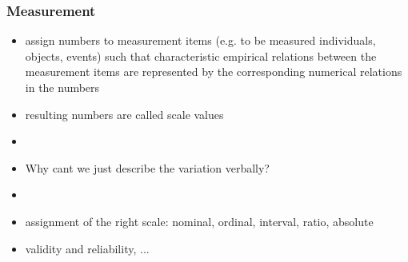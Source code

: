 \documentclass[]{beamer}
\begin{document}
% 


\begin{frame}
\frametitle{Measurement}

\begin{itemize}
 \item assign numbers to measurement items (e.g. to be measured
individuals, objects, events) such that characteristic empirical relations between the measurement items are represented by the corresponding numerical relations in the numbers 
\item resulting numbers are called scale values
\item[]
\item<2->[$\Rightarrow$] Why cant we just describe the variation verbally?
\item<2->[] 
\item<3-> assignment of the right scale: nominal, ordinal, interval,
ratio, absolute
\item<3-> validity and reliability, ... 
\end{itemize}
\end{frame}
\end{document}
